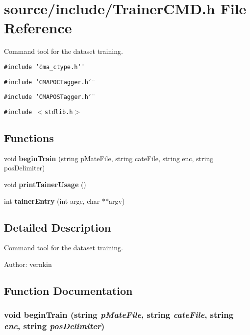 \section{source/include/TrainerCMD.h File Reference}
\label{TrainerCMD_8h}
Command tool for the dataset training. 

{\tt \#include \char`\"{}cma\_\-ctype.h\char`\"{}}\par
{\tt \#include \char`\"{}CMAPOCTagger.h\char`\"{}}\par
{\tt \#include \char`\"{}CMAPOSTagger.h\char`\"{}}\par
{\tt \#include $<$stdlib.h$>$}\par
\subsection*{Functions}
\begin{CompactItemize}
\item 
void {\bf beginTrain} (string pMateFile, string cateFile, string enc, string posDelimiter)
\item 
void {\bf printTainerUsage} ()
\item 
int {\bf tainerEntry} (int argc, char $\ast$$\ast$argv)
\end{CompactItemize}


\subsection{Detailed Description}
Command tool for the dataset training. 

\begin{Desc}
\item[Author:]vernkin \end{Desc}


\subsection{Function Documentation}
\subsubsection{\setlength{\rightskip}{0pt plus 5cm}void beginTrain (string {\em pMateFile}, \/  string {\em cateFile}, \/  string {\em enc}, \/  string {\em posDelimiter})}\label{TrainerCMD_8h_412f108b13959fdc8d7a91eabb2ba536}


